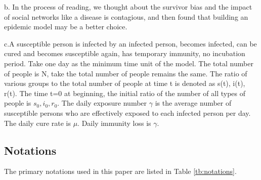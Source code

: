 \documentclass[12pt]{article}  %
\begin{document}
b. In the process of reading, we thought about the survivor bias and the impact of social networks like a disease is contagious, and then found that building an epidemic model may be a better choice.

c.A susceptible person is infected by an infected person, becomes infected, can be cured and becomes susceptible again, has temporary immunity, no incubation period. Take one day as the minimum time unit of the model. The total number of people is N, take the total number of people remains the same. The ratio of various groups to the total number of people at time t is denoted as s(t), i(t), r(t). The time t=0 at beginning, the initial ratio of the number of all types of people is $s_0, i_0, r_0$. The daily exposure number $\gamma$ is the average number of susceptible persons who are effectively exposed to each infected person per day. The daily cure rate is $\mu$. Daily immunity loss is $\gamma$.

\subsection{Notations}
The primary notations used in this paper are listed in Table \ref{tb:notations}.
\end{document}
